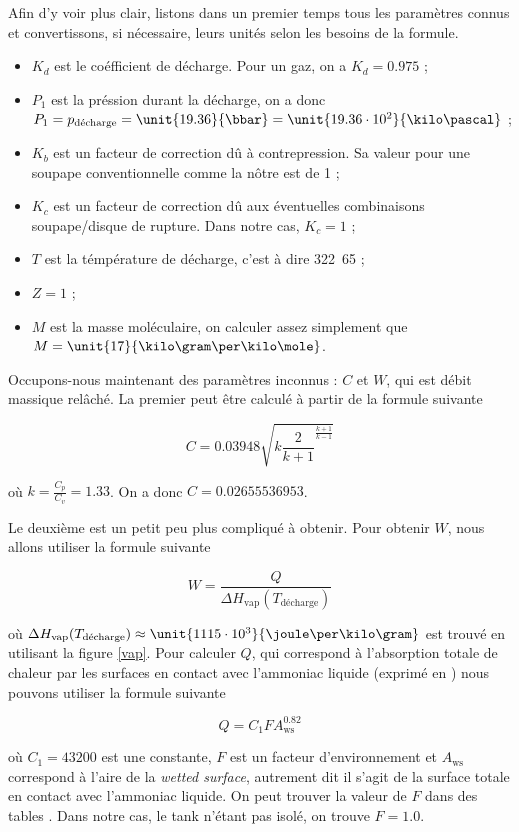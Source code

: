 Afin d'y voir plus clair, listons dans un premier temps 
tous les paramètres connus et convertissons, si nécessaire,
leurs unités selon les besoins de la formule.

\begin{itemize}
	\item $K_d$ est le coéfficient de décharge. Pour un gaz,
	on a $K_d = 0.975$ ;
	\item $P_1$ est la préssion durant la décharge, on a donc
	$P_1 = p_{\text{décharge}} = \unit{19.36}{\bbar} = 
	\unit{19.36\cdot10^2}{\kilo\pascal}$ ;
	\item $K_b$ est un facteur de correction dû à contrepression. 
	Sa valeur pour une soupape conventionnelle comme la nôtre est de 1 ;
	\item $K_c$ est un facteur de correction dû aux éventuelles
	combinaisons soupape/disque de rupture. Dans notre cas, $K_c = 1$ ;
	\item $T$ est la témpérature de décharge, c'est à dire 
	\unit{322.65}{\kelvin} ;
	\item $Z = 1$ ;
	\item $M$ est la masse moléculaire, on calculer assez 
	simplement que $M = \unit{17}{\kilo\gram\per\kilo\mole}$.
\end{itemize}

Occupons-nous maintenant des paramètres inconnus : $C$ et $W$,
qui est débit massique relâché.
La premier peut être calculé à partir de la formule suivante \cite{mignon}

$$C = 0.03948\sqrt{k\frac{2}{k+1}^{\frac{k+1}{k-1}}}$$

où $k = \frac{C_p}{C_v} = 1.33$. On a donc $C = 0.02655536953$.

Le deuxième est un petit peu plus compliqué à obtenir. Pour obtenir
$W$, nous allons utiliser la formule suivante \cite{mignon}

$$W = \frac{Q}{\Delta H_{\text{vap}}(T_{\text{décharge}})}$$ 

où $\Delta H_{\text{vap}}(T_{\text{décharge}}) \approx 
\unit{1115\cdot10^3}{\joule\per\kilo\gram}$ est trouvé en utilisant
la figure \ref{vap}. Pour calculer $Q$, qui correspond à
l'absorption totale de chaleur par les surfaces en contact avec
l'ammoniac liquide (exprimé en \unit{}{\watt}) nous pouvons
utiliser la formule suivante \cite{mignon}

$$Q = C_1FA_{\text{ws}}^{0.82}$$

où $C_1 = 43200$ est une constante, $F$ est un 
facteur d'environnement et $A_{\text{ws}}$ correspond
à l'aire de la \textit{wetted surface}, autrement dit
il s'agit de la surface totale en contact avec l'ammoniac
liquide. On peut trouver la valeur de $F$ dans des tables
\cite{mignon}. Dans notre cas, le tank n'étant pas isolé,
on trouve $F = 1.0$.

